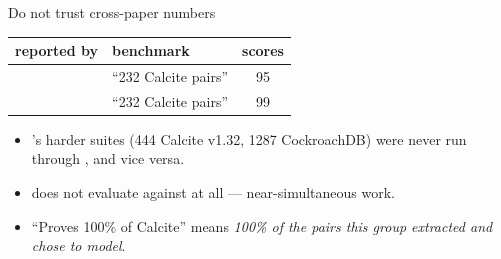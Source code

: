 \documentclass[9pt,aspectratio=169]{beamer}
\begin{document}
\begin{frame}[fragile]{Do not trust cross-paper numbers}
\begin{center}\large
\begin{tabular}{@{}llc@{}}
\toprule
reported by & benchmark & \spes{} scores\\\midrule
\QED{} & ``232 Calcite pairs'' & \alert{95}\\
\sqlsolver{} & ``232 Calcite pairs'' & \alert{99}\\
\bottomrule
\end{tabular}
\end{center}
\vspace{4mm}
\begin{itemize}\small
\item<3-> \QED{}'s harder suites (444 Calcite v1.32, 1287 CockroachDB) were never run through
      \sqlsolver{}, and vice versa.
\item<4-> \QED{} does not evaluate against \sqlsolver{} at all --- near-simultaneous work.
\item<5-> ``Proves 100\% of Calcite'' means \emph{100\% of the pairs this group extracted and
      chose to model}.
\end{itemize}
\end{frame}
\end{document}
